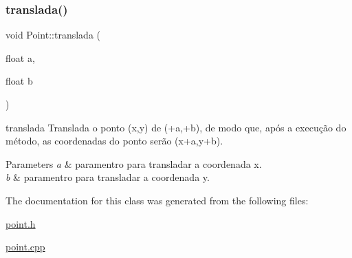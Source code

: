 \subsubsection{\texorpdfstring{translada()}{translada()}}
{\footnotesize\ttfamily void Point\+::translada (\begin{DoxyParamCaption}\item[{float}]{a,  }\item[{float}]{b }\end{DoxyParamCaption})}



translada Translada o ponto (x,y) de (+a,+b), de modo que, após a execução do método, as coordenadas do ponto serão (x+a,y+b). 


\begin{DoxyParams}{Parameters}
{\em a} & paramentro para transladar a coordenada x. \\
\hline
{\em b} & paramentro para transladar a coordenada y. \\
\hline
\end{DoxyParams}


The documentation for this class was generated from the following files\+:\begin{DoxyCompactItemize}
\item 
\mbox{\hyperlink{point_8h}{point.\+h}}\item 
\mbox{\hyperlink{point_8cpp}{point.\+cpp}}\end{DoxyCompactItemize}
